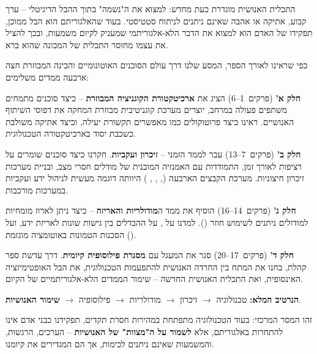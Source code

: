 התכלית האנושית מוגדרת כעת מחדש: למצוא את ה"נשמה" בתוך ההבל הדיגיטלי – ערך קבוע, אתיקה או אהבה שאינם ניתנים לניתוח סטטיסטי. בעוד שהאלגוריתם הוא הבל ממוכן, תפקידו של האדם הוא למצוא את הדבר הלא-אלגוריתמי שמעניק לקיום משמעות, ובכך להציל את עצמו מחוסר התכלית של המכונה שהוא ברא.


כפי שראינו לאורך הספר, המסע שלנו דרך עולם הסוכנים האוטונומיים והבינה המבוזרת חצה ארבעה ממדים משלימים:

\textbf{חלק א'} (פרקים~\num{1}--\num{6}) הציג את \textbf{ארכיטקטורת הקוגניציה המבוזרת} – כיצד סוכנים מתמחים משתפים פעולה במרחב, יוצרים מערכת קוגניטיבית מבוזרת המחקה את דפוסי השיתוף האנושיים. ראינו כיצד פרוטוקולים כמו  מאפשרים תקשורת יעילה, וכיצד אתיקה משולבת כשכבת יסוד בארכיטקטורה הטכנולוגית.

\textbf{חלק ב'} (פרקים~\num{7}--\num{13}) עבר לממד הזמני – \textbf{זיכרון ועקביות}. חקרנו כיצד סוכנים שומרים על רציפות לאורך זמן, התמודדות עם האמנזיה המובנית של מודלים חסרי מצב, ובניית מערכות זיכרון חיצוניות. מערכת הקבצים הארבעה (, , , ) היוותה דוגמה מעשית לניהול ידע ועקביות במערכות מורכבות.

\textbf{חלק ג'} (פרקים~\num{14}--\num{16}) הוסיף את ממד ה\textbf{מודולריות והאריזה} – כיצד ניתן לארוז מומחיות למודולים ניתנים לשימוש חוזר (). למדנו על , על ההבדלים בין גישות שונות לאריזת ידע, ועל הסכנות הטמונות באוטומציה מוגזמת ().

\textbf{חלק ד'} (פרקים~\num{17}--\num{20}) סגר את המעגל עם \textbf{מסגרת פילוסופית קיומית}. דרך עדשת ספר קהלת, בחנו את המתח בין החרדה האנושית להתפעמות הטכנולוגית, את הבל האופטימיזציה האינסופית, ואת התכלית האנושית החדשה – שימור הממדים הלא-אלגוריתמיים של הקיום.

\textbf{הנרטיב המלא:} טכנולוגיה $\rightarrow$ זיכרון $\rightarrow$ מודולריות $\rightarrow$ פילוסופיה $\rightarrow$ \textbf{שימור האנושיות}.

זהו המסר המרכזי: בעוד הטכנולוגיה מתפתחת במהירות חסרת תקדים, תפקידנו כבני אדם אינו להתחרות באלגוריתם, אלא \textbf{לשמור על ה"מצוות" של האנושיות} – הערכים, הרגשות, והמשמעות שאינם ניתנים לכימות, אך הם המגדירים את קיומנו.
